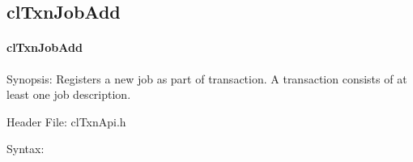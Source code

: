 \begin{flushleft}
\subsection{clTxnJobAdd}
\hypertarget{pagetxn107}{}\paragraph{cl\-Txn\-Job\-Add}\label{pagetxn107}
\begin{Desc}
\item[Synopsis:]Registers a new job as part of transaction. A transaction consists of at least one job description.\end{Desc}
\begin{Desc}
\item[Header File:]clTxnApi.h\end{Desc}
\begin{Desc}
\item[Syntax:]


\end{Desc}
\end{flushleft}
